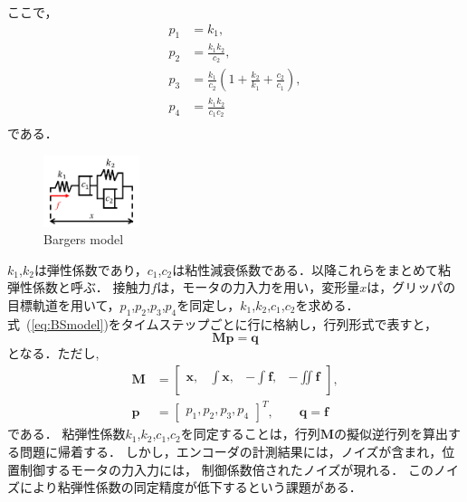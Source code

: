 \documentclass[a4paper]{jarticle}
\begin{document}
ここで，
\begin{equation}
    \begin{aligned}
        p_1 &= k_1,  \\
        p_2 &= \frac{k_1 k_2}{c_2},    \\
        p_3 &= \frac{k_1}{c_2}\left(1+\frac{k_2}{k_1}+\frac{c_2}{c_1}\right),\\
        p_4 &= \frac{k_1k_2}{c_1 c_2} \\
    \end{aligned}
    \label{eq:p2ck}
\end{equation}
である．
\begin{figure}[htbp]
    \centering
    \includegraphics[width=0.25\textwidth]{BS_model.pdf}
    \caption{Bargers model}
    \label{fig:BS_model}
\end{figure}
$k_1$,$k_2$は弾性係数であり，$c_1$,$c_2$は粘性減衰係数である．以降これらをまとめて粘弾性係数と呼ぶ．
接触力$f$は，モータの力入力を用い，変形量$x$は，グリッパの目標軌道を用いて，$p_1$,$p_2$,$p_3$,$p_4$を同定し，$k_1$,$k_2$,$c_1$,$c_2$を求める．
式~(\ref{eq:BSmodel})をタイムステップごとに行に格納し，行列形式で表すと，
\begin{equation}
    \mathbf{M}\mathbf{p} = \mathbf{q} 
    \label{eq:Mp_q}
\end{equation}
となる．ただし,
\begin{equation}
    \begin{aligned}
        \mathbf{M} &= \begin{bmatrix}
            \boldsymbol{x}, & \int{\boldsymbol{x}}, & -\int{\boldsymbol{f}}, & -\iint{\boldsymbol{f}}\\
        \end{bmatrix}, \\
        \mathbf{p}  &= \begin{bmatrix}
            p_1 ,p_2 ,p_3 ,p_4
        \end{bmatrix}^{T}, \quad\quad
        \mathbf{q}   = \boldsymbol{f}
    \end{aligned}
\label{eq:BSmodel_matrix}
\end{equation}
である．
粘弾性係数$k_1$,$k_2$,$c_1$,$c_2$を同定することは，行列$\mathbf{M}$の擬似逆行列を算出する問題に帰着する．
しかし，エンコーダの計測結果には，ノイズが含まれ，位置制御するモータの力入力には，{\color{red} 制御係数倍}されたノイズが現れる．
このノイズにより粘弾性係数の同定精度が低下するという課題がある．
\end{document}
